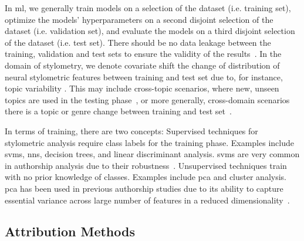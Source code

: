 

In \ac{ml}, we generally train models on a selection of the dataset (i.e. training set), optimize the models' hyperparameters on a second disjoint selection of the dataset (i.e. validation set), and evaluate the models on a third disjoint selection of the dataset (i.e. test set).
There should be no data leakage between the training, validation and test sets to ensure the validity of the results~\citep{bischoff_importance_2020,altakrori_topic_2021,boenninghoff_o2d2_2021}.
In the domain of stylometry, we denote covariate shift the change of distribution of neural stylometric features between training and test set due to, for instance, topic variability \citep{boenninghoff_o2d2_2021}.
This may include cross-topic scenarios, where new, unseen topics are used in the testing phase~\citep{altakrori_topic_2021}, or more generally, cross-domain scenarios there is a topic or genre change between training and test set~\citep{barlas_cross_domain_2020}.

In terms of training, there are two concepts:
Supervised techniques for stylometric analysis require class labels for the training phase.
Examples include \acp{svm}, \acp{nn}, decision trees, and linear discriminant analysis.
\acp{svm} are very common in authorship analysis due to their robustness~\citep{abbasi_writeprints_2008}.
Unsupervised techniques train with no prior knowledge of classes.
Examples include \ac{pca} and cluster analysis.
\ac{pca} has been used in previous authorship studies due to its ability to capture essential variance across large number of features in a reduced dimensionality~\citep{abbasi_writeprints_2008}.

\subsection{Attribution Methods}
\label{subsec:attribution_methods}

